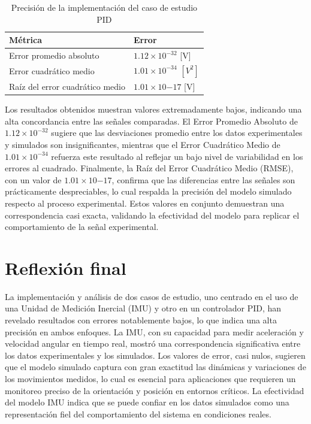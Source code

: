 \begin{table}[htbp!]
    \centering
    \caption{Precisión de la implementación del caso de estudio PID}
    \label{tab:filter-errorzgrad}
    \begin{tabular}{ll}
    Métrica                       & Error \\ \hline
    Error promedio absoluto         &   $1.12\times 10^{-32}$ [V]\\
    Error cuadrático medio          &   $1.01 \times 10^{-34}$ $[V^{2}]$    \\
    Raíz del error cuadrático medio &   $1.01 \times 10{-17}$ [V]  
    \end{tabular}
\end{table}


Los resultados obtenidos muestran valores extremadamente bajos, indicando una alta concordancia entre las señales comparadas. El Error Promedio Absoluto de $1.12\times 10^{-32}$ sugiere que las desviaciones promedio entre los datos experimentales y simulados son insignificantes, mientras que el Error Cuadrático Medio de 
 $1.01 \times 10^{-34}$  refuerza este resultado al reflejar un bajo nivel de variabilidad en los errores al cuadrado. Finalmente, la Raíz del Error Cuadrático Medio (RMSE), con un valor de $1.01 \times 10{-17}$, confirma que las diferencias entre las señales son prácticamente despreciables, lo cual respalda la precisión del modelo simulado respecto al proceso experimental. Estos valores en conjunto demuestran una correspondencia casi exacta, validando la efectividad del modelo para replicar el comportamiento de la señal experimental.

\section{Reflexión final}


La implementación y análisis de dos casos de estudio, uno centrado en el uso de una Unidad de Medición Inercial (IMU) y otro en un controlador PID, han revelado resultados con errores notablemente bajos, lo que indica una alta precisión en ambos enfoques. La IMU, con su capacidad para medir aceleración y velocidad angular en tiempo real, mostró una correspondencia significativa entre los datos experimentales y los simulados. Los valores de error, casi nulos, sugieren que el modelo simulado captura con gran exactitud las dinámicas y variaciones de los movimientos medidos, lo cual es esencial para aplicaciones que requieren un monitoreo preciso de la orientación y posición en entornos críticos. La efectividad del modelo IMU indica que se puede confiar en los datos simulados como una representación fiel del comportamiento del sistema en condiciones reales.

